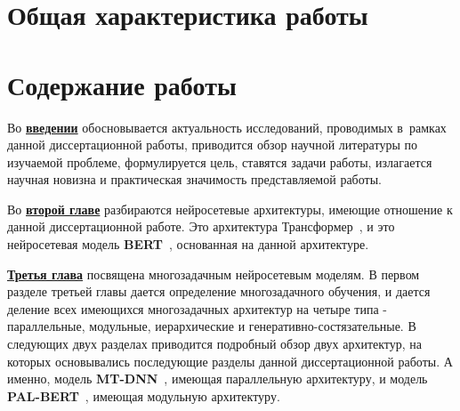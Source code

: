 \section*{Общая характеристика работы}

\newcommand{\actuality}{\underline{\textbf{\actualityTXT}}}
\newcommand{\progress}{\underline{\textbf{\progressTXT}}}
\newcommand{\aim}{\underline{{\textbf\aimTXT}}}
\newcommand{\tasks}{\underline{\textbf{\tasksTXT}}}
\newcommand{\novelty}{\underline{\textbf{\noveltyTXT}}}
\newcommand{\appropriation}{\underline{\textbf{\appropriationTXT}}}
\newcommand{\influence}{\underline{\textbf{\influenceTXT}}}
\newcommand{\methods}{\underline{\textbf{\methodsTXT}}}
\newcommand{\defpositions}{\underline{\textbf{\defpositionsTXT}}}
\newcommand{\reliability}{\underline{\textbf{\reliabilityTXT}}}
\newcommand{\probation}{\underline{\textbf{\probationTXT}}}
\newcommand{\contribution}{\underline{\textbf{\contributionTXT}}}
\newcommand{\publications}{\underline{\textbf{\publicationsTXT}}}



\section*{Содержание работы}
Во \underline{\textbf{введении}} обосновывается актуальность
исследований, проводимых в~рамках данной диссертационной работы,
приводится обзор научной литературы по изучаемой проблеме,
формулируется цель, ставятся задачи работы, излагается научная новизна
и практическая значимость представляемой работы. 

Во \underline{\textbf{второй главе}} разбираются нейросетевые архитектуры, имеющие отношение к данной диссертационной работе. Это архитектура Трансформер~\cite{vaswani_2017}, и это нейросетевая модель \textbf{BERT}~\cite{devlin_2018}, основанная на данной архитектуре.

\underline{\textbf{Третья глава}} посвящена многозадачным нейросетевым моделям. В первом разделе третьей главы дается определение многозадачного обучения, и дается деление всех имеющихся многозадачных архитектур на четыре типа - параллельные, модульные, иерархические и генеративно-состязательные. В следующих двух разделах приводится подробный обзор двух архитектур, на которых основывались последующие разделы данной диссертационной работы. А именно, модель \textbf{MT-DNN}~\cite{mtdnn}, имеющая параллельную архитектуру, и модель \textbf{PAL-BERT}~\cite{stickland_2019}, имеющая модульную архитектуру. 

